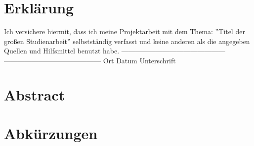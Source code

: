 \documentclass[12pt, a4paper]{scrbook}
\begin{document}

\setlength{\parindent}{0em} 
\renewcommand\thechapter{\Roman{chapter}}
\let\cleardoublepage\relax
\section*{Erklärung}
Ich versichere hiermit, dass ich meine Projektarbeit mit dem Thema: ''Titel der großen Studienarbeit'' selbstständig verfasst und keine anderen als die angegeben Quellen und Hilfsmittel benutzt
habe.
\newline
\newline
\newline
\newline
---------------------------------------------       ------------------------------------------ \newline
Ort	\hspace{2cm}		Datum\hspace{3,5 cm}				    Unterschrift
\newpage
\section*{Abstract}


\newpage
\begingroup
\renewcommand*{\chapterpagestyle}{empty}
\pagestyle{empty}
\tableofcontents
\listoffigures
\section*{Abkürzungen}
\begin{acronym}[Bash]
\end{acronym}
\endgroup
\newpage
\pagestyle{plain}
\setcounter{page}{1}
\end{document}
